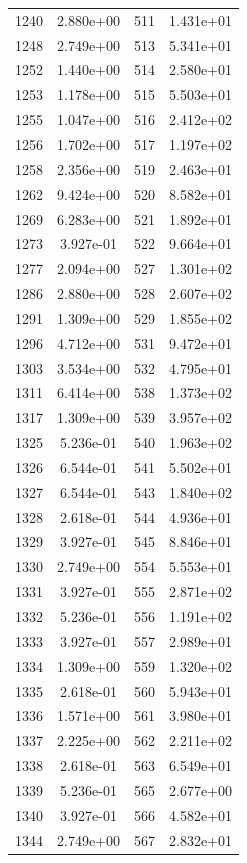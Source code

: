 \documentclass[12pt]{article}
\begin{document}
\begin{longtable}{@{}cccc@{}}
1240 & 2.880e+00 & 511 & 1.431e+01 \\
1248 & 2.749e+00 & 513 & 5.341e+01 \\
1252 & 1.440e+00 & 514 & 2.580e+01 \\
1253 & 1.178e+00 & 515 & 5.503e+01 \\
1255 & 1.047e+00 & 516 & 2.412e+02 \\
1256 & 1.702e+00 & 517 & 1.197e+02 \\
1258 & 2.356e+00 & 519 & 2.463e+01 \\
1262 & 9.424e+00 & 520 & 8.582e+01 \\
1269 & 6.283e+00 & 521 & 1.892e+01 \\
1273 & 3.927e-01 & 522 & 9.664e+01 \\
1277 & 2.094e+00 & 527 & 1.301e+02 \\
1286 & 2.880e+00 & 528 & 2.607e+02 \\
1291 & 1.309e+00 & 529 & 1.855e+02 \\
1296 & 4.712e+00 & 531 & 9.472e+01 \\
1303 & 3.534e+00 & 532 & 4.795e+01 \\
1311 & 6.414e+00 & 538 & 1.373e+02 \\
1317 & 1.309e+00 & 539 & 3.957e+02 \\
1325 & 5.236e-01 & 540 & 1.963e+02 \\
1326 & 6.544e-01 & 541 & 5.502e+01 \\
1327 & 6.544e-01 & 543 & 1.840e+02 \\
1328 & 2.618e-01 & 544 & 4.936e+01 \\
1329 & 3.927e-01 & 545 & 8.846e+01 \\
1330 & 2.749e+00 & 554 & 5.553e+01 \\
1331 & 3.927e-01 & 555 & 2.871e+02 \\
1332 & 5.236e-01 & 556 & 1.191e+02 \\
1333 & 3.927e-01 & 557 & 2.989e+01 \\
1334 & 1.309e+00 & 559 & 1.320e+02 \\
1335 & 2.618e-01 & 560 & 5.943e+01 \\
1336 & 1.571e+00 & 561 & 3.980e+01 \\
1337 & 2.225e+00 & 562 & 2.211e+02 \\
1338 & 2.618e-01 & 563 & 6.549e+01 \\
1339 & 5.236e-01 & 565 & 2.677e+00 \\
1340 & 3.927e-01 & 566 & 4.582e+01 \\
1344 & 2.749e+00 & 567 & 2.832e+01 \\

\end{longtable}
\end{document}
